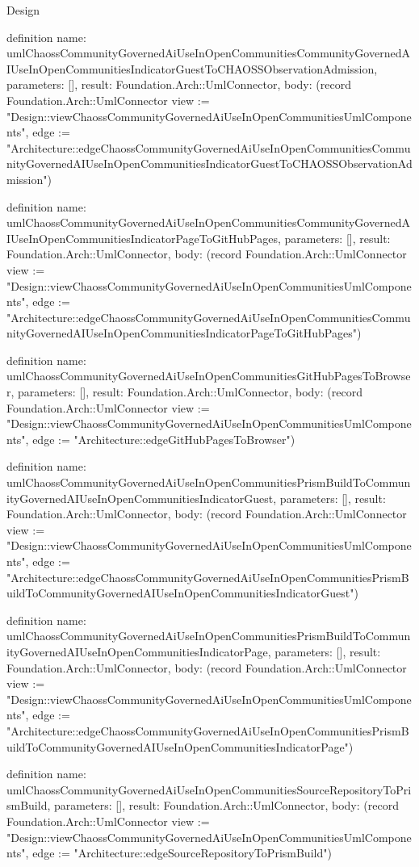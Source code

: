 \begin{lexlean}{Design}
\begin{semanticmodule}
definition{
  name: umlChaossCommunityGovernedAiUseInOpenCommunitiesCommunityGovernedAIUseInOpenCommunitiesIndicatorGuestToCHAOSSObservationAdmission,
  parameters: [],
  result: Foundation.Arch::UmlConnector,
  body: (record Foundation.Arch::UmlConnector {view := "Design::viewChaossCommunityGovernedAiUseInOpenCommunitiesUmlComponents", edge := "Architecture::edgeChaossCommunityGovernedAiUseInOpenCommunitiesCommunityGovernedAIUseInOpenCommunitiesIndicatorGuestToCHAOSSObservationAdmission"})
}

definition{
  name: umlChaossCommunityGovernedAiUseInOpenCommunitiesCommunityGovernedAIUseInOpenCommunitiesIndicatorPageToGitHubPages,
  parameters: [],
  result: Foundation.Arch::UmlConnector,
  body: (record Foundation.Arch::UmlConnector {view := "Design::viewChaossCommunityGovernedAiUseInOpenCommunitiesUmlComponents", edge := "Architecture::edgeChaossCommunityGovernedAiUseInOpenCommunitiesCommunityGovernedAIUseInOpenCommunitiesIndicatorPageToGitHubPages"})
}

definition{
  name: umlChaossCommunityGovernedAiUseInOpenCommunitiesGitHubPagesToBrowser,
  parameters: [],
  result: Foundation.Arch::UmlConnector,
  body: (record Foundation.Arch::UmlConnector {view := "Design::viewChaossCommunityGovernedAiUseInOpenCommunitiesUmlComponents", edge := "Architecture::edgeGitHubPagesToBrowser"})
}

definition{
  name: umlChaossCommunityGovernedAiUseInOpenCommunitiesPrismBuildToCommunityGovernedAIUseInOpenCommunitiesIndicatorGuest,
  parameters: [],
  result: Foundation.Arch::UmlConnector,
  body: (record Foundation.Arch::UmlConnector {view := "Design::viewChaossCommunityGovernedAiUseInOpenCommunitiesUmlComponents", edge := "Architecture::edgeChaossCommunityGovernedAiUseInOpenCommunitiesPrismBuildToCommunityGovernedAIUseInOpenCommunitiesIndicatorGuest"})
}

definition{
  name: umlChaossCommunityGovernedAiUseInOpenCommunitiesPrismBuildToCommunityGovernedAIUseInOpenCommunitiesIndicatorPage,
  parameters: [],
  result: Foundation.Arch::UmlConnector,
  body: (record Foundation.Arch::UmlConnector {view := "Design::viewChaossCommunityGovernedAiUseInOpenCommunitiesUmlComponents", edge := "Architecture::edgeChaossCommunityGovernedAiUseInOpenCommunitiesPrismBuildToCommunityGovernedAIUseInOpenCommunitiesIndicatorPage"})
}

definition{
  name: umlChaossCommunityGovernedAiUseInOpenCommunitiesSourceRepositoryToPrismBuild,
  parameters: [],
  result: Foundation.Arch::UmlConnector,
  body: (record Foundation.Arch::UmlConnector {view := "Design::viewChaossCommunityGovernedAiUseInOpenCommunitiesUmlComponents", edge := "Architecture::edgeSourceRepositoryToPrismBuild"})
}


\end{semanticmodule}
\end{lexlean}
